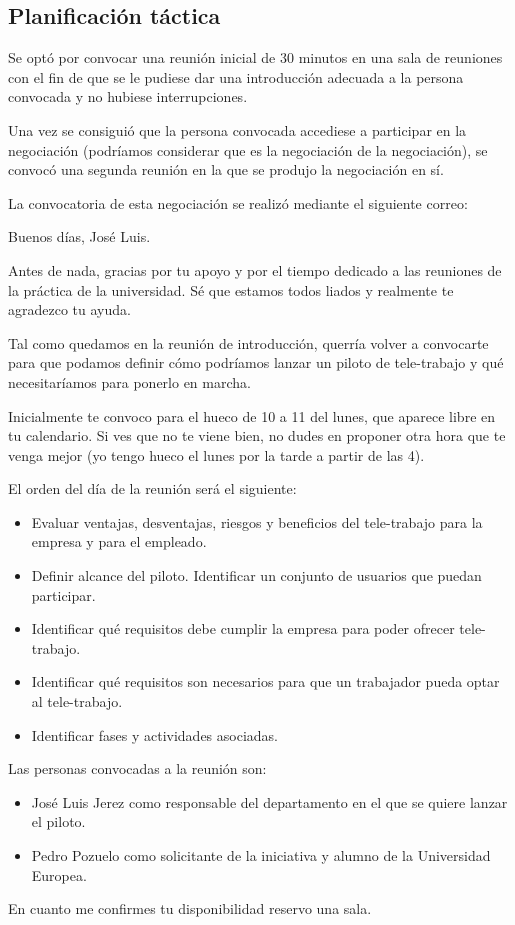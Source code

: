 \subsection{Planificación táctica}
\par Se optó por convocar una reunión inicial de 30 minutos en una sala de reuniones con el fin de que se le pudiese dar una introducción adecuada a la persona convocada y no hubiese interrupciones.
\par Una vez se consiguió que la persona convocada accediese a participar en la negociación (podríamos considerar que es la negociación de la negociación), se convocó una segunda reunión en la que se produjo la negociación en sí.
\par La convocatoria de esta negociación se realizó mediante el siguiente correo:
\begin{displayquote}
  {\em 
\par Buenos días, José Luis.
\par Antes de nada, gracias por tu apoyo y por el tiempo dedicado a las reuniones de la práctica de la universidad. Sé que estamos todos liados y realmente te
  agradezco tu ayuda.
\par Tal como quedamos en la reunión de introducción, querría volver a convocarte para que podamos definir cómo podríamos lanzar un piloto de tele-trabajo y qué necesitaríamos para ponerlo en marcha.
\par Inicialmente te convoco para el hueco de 10 a 11 del lunes, que aparece libre en tu calendario. Si ves que no te viene bien, no dudes en proponer otra hora que
  te venga mejor (yo tengo hueco el lunes por la tarde a partir de las 4).
\par El orden del día de la reunión será el siguiente:
  \begin{itemize}
    \item Evaluar ventajas, desventajas, riesgos y beneficios del tele-trabajo para la empresa y para el empleado.
    \item Definir alcance del piloto. Identificar un conjunto de usuarios que puedan participar.
    \item Identificar qué requisitos debe cumplir la empresa para poder ofrecer tele-trabajo.
    \item Identificar qué requisitos son necesarios para que un trabajador pueda optar al tele-trabajo.
    \item Identificar fases y actividades asociadas.
\end{itemize}
\par Las personas convocadas a la reunión son:
  \begin{itemize}
    \item José Luis Jerez como responsable del departamento en el que se quiere lanzar el piloto.
    \item Pedro Pozuelo como solicitante de la iniciativa y alumno de la Universidad Europea.
  \end{itemize}
  \par En cuanto me confirmes tu disponibilidad reservo una sala.

}
\end{displayquote}
